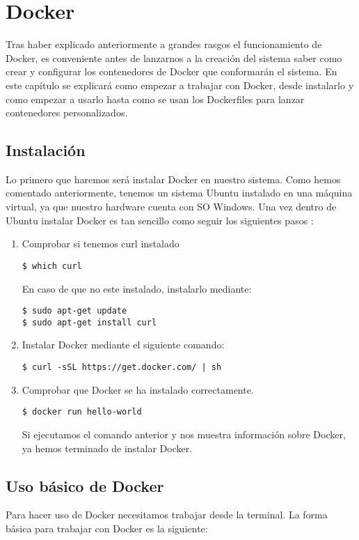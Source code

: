\chapter{Docker}
Tras haber explicado anteriormente a grandes rasgos el funcionamiento de Docker, es conveniente antes de lanzarnos a la creación del sistema saber como crear y configurar los contenedores de Docker que conformarán el sistema. En este capítulo se explicará como empezar a trabajar con Docker, desde instalarlo y como empezar a usarlo hasta como se usan los Dockerfiles para lanzar contenedores personalizados.

	\section{Instalación}
	Lo primero que haremos será instalar Docker en nuestro sistema. Como hemos comentado anteriormente, tenemos un sistema Ubuntu instalado en una máquina virtual, ya que nuestro hardware cuenta con SO Windows. Una vez dentro de Ubuntu instalar Docker es tan sencillo como seguir los siguientes pasos \cite{docker-install}:
	
	\lstset{language=bash, breaklines=true, basicstyle=\footnotesize}
	\begin{enumerate}
		\item Comprobar si tenemos curl instalado
		\begin{lstlisting}[style=consola]
$ which curl
		\end{lstlisting}
		En caso de que no este instalado, instalarlo mediante:
		\begin{lstlisting}[style=consola]
$ sudo apt-get update
$ sudo apt-get install curl
		\end{lstlisting}
		\item Instalar Docker mediante el siguiente comando:
		\begin{lstlisting}[style=consola]
$ curl -sSL https://get.docker.com/ | sh
		\end{lstlisting}
		\item Comprobar que Docker se ha instalado correctamente.
		\begin{lstlisting}[style=consola]
$ docker run hello-world
		\end{lstlisting}
			Si ejecutamos el comando anterior y nos muestra información sobre Docker, ya hemos terminado de instalar Docker.
	\end{enumerate}
	
	\section{Uso básico de Docker}
	Para hacer uso de Docker necesitamos trabajar desde la terminal. La forma básica para trabajar con Docker es la siguiente:
	
